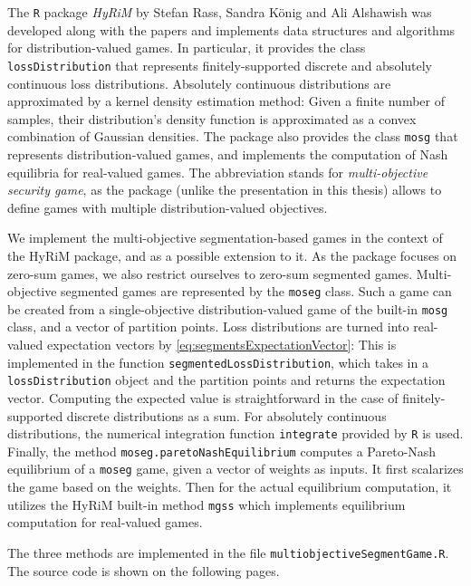 \documentclass[a4paper,DIV=11]{scrreprt}
\theoremstyle{definition}
\begin{document}
    The \texttt{R} package \emph{HyRiM} \cite{bib:hyrimPackage} by Stefan Rass, Sandra König and Ali Alshawish was developed along with the papers \cite{bib:rassGameRiskManagI,bib:rassGameRiskManagII,bib:rassGameRiskManagIII} and implements data structures and algorithms for distribution-valued games.
    In particular, it provides the class \texttt{lossDistribution} that represents finitely-supported discrete and absolutely continuous loss distributions. Absolutely continuous distributions are approximated by a kernel density estimation method: Given a finite number of samples, their distribution's density function is approximated as a convex combination of Gaussian densities. The package also provides the class \texttt{mosg} that represents distribution-valued games, and implements the computation of Nash equilibria for real-valued games. 
    The abbreviation stands for \emph{multi-objective security game}, as the package (unlike the presentation in this thesis) allows to define games with multiple distribution-valued objectives.
    
    We implement the multi-objective segmentation-based games in the context of the HyRiM package, and as a possible extension to it. As the package focuses on zero-sum games, we also restrict ourselves to zero-sum segmented games.
    Multi-objective segmented games are represented by the \texttt{moseg} class. Such a game can be created from a single-objective distribution-valued game of the built-in \texttt{mosg} class, and a vector of partition points.
    Loss distributions are turned into real-valued expectation vectors by \eqref{eq:segmentsExpectationVector}: This is implemented in the function \texttt{segmentedLossDistribution}, which takes in a \texttt{lossDistribution} object and the partition points and returns the expectation vector.
    Computing the expected value is straightforward in the case of finitely-supported discrete distributions as a sum. For absolutely continuous distributions, the numerical integration function \texttt{integrate} provided by \texttt{R} is used.
    Finally, the method \texttt{moseg.paretoNashEquilibrium} computes a Pareto-Nash equilibrium of a \texttt{moseg} game, given a vector of weights as inputs.
    It first scalarizes the game based on the weights.
    Then for the actual equilibrium computation, it utilizes the HyRiM built-in method \texttt{mgss} which implements equilibrium computation for real-valued games.
    
    The three methods are implemented in the file \texttt{multiobjectiveSegmentGame.R}. The source code is shown on the following pages.
    
\end{document}

